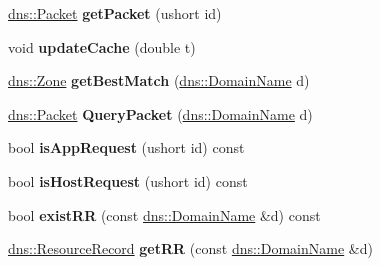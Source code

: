 \begin{DoxyCompactItemize}
\item 
\hyperlink{structdns_1_1Packet}{dns\+::\+Packet} {\bfseries get\+Packet} (ushort id)\hypertarget{classdns__server_afcfb30629b4d0538bac2c44f1659d9eb}{}\label{classdns__server_afcfb30629b4d0538bac2c44f1659d9eb}

\item 
void {\bfseries update\+Cache} (double t)\hypertarget{classdns__server_af8c786411d5c0eb9f24f53c928ac9b48}{}\label{classdns__server_af8c786411d5c0eb9f24f53c928ac9b48}

\item 
\hyperlink{structdns_1_1Zone}{dns\+::\+Zone} {\bfseries get\+Best\+Match} (\hyperlink{structdns_1_1DomainName}{dns\+::\+Domain\+Name} d)\hypertarget{classdns__server_a0b1f6f215b752925e9901adf16df7edf}{}\label{classdns__server_a0b1f6f215b752925e9901adf16df7edf}

\item 
\hyperlink{structdns_1_1Packet}{dns\+::\+Packet} {\bfseries Query\+Packet} (\hyperlink{structdns_1_1DomainName}{dns\+::\+Domain\+Name} d)\hypertarget{classdns__server_ac4a4d1569cfb515454b442a2bd0d84db}{}\label{classdns__server_ac4a4d1569cfb515454b442a2bd0d84db}

\item 
bool {\bfseries is\+App\+Request} (ushort id) const \hypertarget{classdns__server_a87c7e3fe0cfa2e0cf4ac452b9dbf05da}{}\label{classdns__server_a87c7e3fe0cfa2e0cf4ac452b9dbf05da}

\item 
bool {\bfseries is\+Host\+Request} (ushort id) const \hypertarget{classdns__server_a86c84b8b2f3e35d546a3ad9660944de9}{}\label{classdns__server_a86c84b8b2f3e35d546a3ad9660944de9}

\item 
bool {\bfseries exist\+RR} (const \hyperlink{structdns_1_1DomainName}{dns\+::\+Domain\+Name} \&d) const \hypertarget{classdns__server_ab0d83fc5df34b863592c906f01e681bc}{}\label{classdns__server_ab0d83fc5df34b863592c906f01e681bc}

\item 
\hyperlink{structdns_1_1ResourceRecord}{dns\+::\+Resource\+Record} {\bfseries get\+RR} (const \hyperlink{structdns_1_1DomainName}{dns\+::\+Domain\+Name} \&d)\hypertarget{classdns__server_a2c2bffe8648fed6274b8fcde47f2f3bd}{}\label{classdns__server_a2c2bffe8648fed6274b8fcde47f2f3bd}

\end{DoxyCompactItemize}
